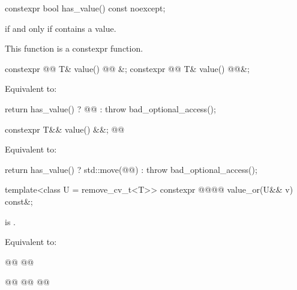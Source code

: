 %
\begin{itemdecl}
constexpr bool has_value() const noexcept;
\end{itemdecl}

\begin{itemdescr}
\pnum
\returns
{} if and only if  contains a value.

\pnum
\remarks
This function is a constexpr function.
\end{itemdescr}

%
\begin{itemdecl}
constexpr @@ T& value() @@ &;
constexpr @@ T& value() @@&;
\end{itemdecl}

\begin{itemdescr}
\pnum
\effects
Equivalent to:
\begin{codeblock}
return has_value() ? @@ : throw bad_optional_access();
\end{codeblock}
\end{itemdescr}

%
\begin{itemdecl}
constexpr T&& value() &&;
@@
\end{itemdecl}

\begin{itemdescr}
\pnum
\effects
Equivalent to:
\begin{codeblock}
return has_value() ? std::move(@@) : throw bad_optional_access();
\end{codeblock}
\end{itemdescr}

%
\begin{itemdecl}
template<class U = remove_cv_t<T>>
  constexpr @@@@ value_or(U&& v) const&;
\end{itemdecl}

\begin{itemdescr}
\pnum
\mandates
{} is  .

\pnum
\effects
Equivalent to:
\begin{codeblock}
@@
@@

@@
  @@
@@
\end{codeblock}
\end{itemdescr}

